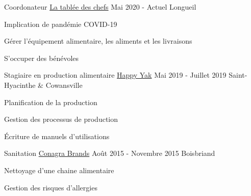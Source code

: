 

\begin{cventries}

  \cventry
    {Coordonateur} %
    {\href{https://www.tableedeschefs.org/en/}{La tablée des chefs}} %
    {Mai 2020 - Actuel} %
    {Longueil} %
    {
      \begin{cvitems} %
        \item {Implication de pandémie COVID-19}
        \item {Gérer l'équipement alimentaire, les aliments et les livraisons}
        \item {S'occuper des bénévoles}
      \end{cvitems}
    }

  \cventry
    {Stagiaire en production alimentaire} %
    {\href{https://happyyak.ca/en/}{Happy Yak}} %
    {Mai 2019 - Juillet 2019} %
    {Saint-Hyacinthe \& Cowansville} %
    {
      \begin{cvitems} %
        \item {Planification de la production}
        \item {Gestion des processus de production}
        \item {Écriture de manuels d'utilisations}
      \end{cvitems}
    }

  \cventry
    {Sanitation} %
    {\href{http://www.conagrabrands.ca/en/brands}{Conagra Brands}} %
    {Août 2015 - Novembre 2015} %
    {Boisbriand} %
    {
      \begin{cvitems} %
        \item {Nettoyage d'une chaine alimentaire}
        \item {Gestion des risques d'allergies}
      \end{cvitems}
    }


\end{cventries}
